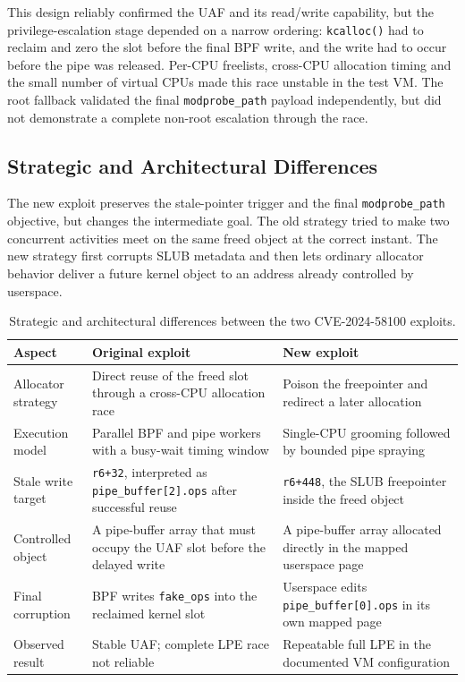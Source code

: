 \documentclass[../main.tex]{subfiles}
\begin{document}
This design reliably confirmed the UAF and its read/write capability, but the privilege-escalation stage depended on a narrow ordering: \texttt{kcalloc()} had to reclaim and zero the slot before the final BPF write, and the write had to occur before the pipe was released. Per-CPU freelists, cross-CPU allocation timing and the small number of virtual CPUs made this race unstable in the test VM. The root fallback validated the final \texttt{modprobe\_path} payload independently, but did not demonstrate a complete non-root escalation through the race.

\subsection{Strategic and Architectural Differences}

The new exploit preserves the stale-pointer trigger and the final \texttt{modprobe\_path} objective, but changes the intermediate goal. The old strategy tried to make two concurrent activities meet on the same freed object at the correct instant. The new strategy first corrupts SLUB metadata and then lets ordinary allocator behavior deliver a future kernel object to an address already controlled by userspace.

\begin{table}[H]
\centering
\begin{tabularx}{\textwidth}{|l|X|X|}
\hline
\textbf{Aspect} & \textbf{Original exploit} & \textbf{New exploit} \\
\hline
Allocator strategy & Direct reuse of the freed slot through a cross-CPU allocation race & Poison the freepointer and redirect a later allocation \\
\hline
Execution model & Parallel BPF and pipe workers with a busy-wait timing window & Single-CPU grooming followed by bounded pipe spraying \\
\hline
Stale write target & \texttt{r6+32}, interpreted as \texttt{pipe\_buffer[2].ops} after successful reuse & \texttt{r6+448}, the SLUB freepointer inside the freed object \\
\hline
Controlled object & A pipe-buffer array that must occupy the UAF slot before the delayed write & A pipe-buffer array allocated directly in the mapped userspace page \\
\hline
Final corruption & BPF writes \texttt{fake\_ops} into the reclaimed kernel slot & Userspace edits \texttt{pipe\_buffer[0].ops} in its own mapped page \\
\hline
Observed result & Stable UAF; complete LPE race not reliable & Repeatable full LPE in the documented VM configuration \\
\hline
\end{tabularx}
\caption{Strategic and architectural differences between the two CVE-2024-58100 exploits.}
\end{table}
\end{document}
